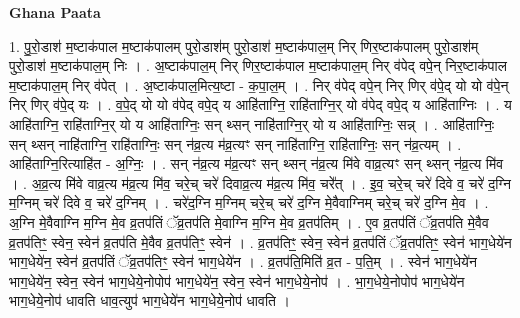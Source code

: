 \documentclass[17pt]{extarticle}
\begin{document}
\textbf{Ghana Paata } \newline

1. पु॒रो॒डाश॑ म॒ष्टाक॑पाल म॒ष्टाक॑पालम् पुरो॒डाश॑म् पुरो॒डाश॑ म॒ष्टाक॑पाल॒म् निर् णिर॒ष्टाक॑पालम् पुरो॒डाश॑म् पुरो॒डाश॑ म॒ष्टाक॑पाल॒म् निः । . अ॒ष्टाक॑पाल॒म् निर् णिर॒ष्टाक॑पाल म॒ष्टाक॑पाल॒म् निर् व॑पेद् वपे॒न् निर॒ष्टाक॑पाल म॒ष्टाक॑पाल॒म् निर् व॑पेत् । . अ॒ष्टाक॑पाल॒मित्य॒ष्टा - क॒पा॒ल॒म् । . निर् व॑पेद् वपे॒न् निर् णिर् व॑पे॒द् यो यो व॑पे॒न् निर् णिर् व॑पे॒द् यः । . व॒पे॒द् यो यो व॑पेद् वपे॒द् य आहि॑ताग्नि॒ राहि॑ताग्नि॒र् यो व॑पेद् वपे॒द् य आहि॑ताग्निः । . य आहि॑ताग्नि॒ राहि॑ताग्नि॒र् यो य आहि॑ताग्निः॒ सन् थ्सन् नाहि॑ताग्नि॒र् यो य आहि॑ताग्निः॒ सन्न् । . आहि॑ताग्निः॒ सन् थ्सन् नाहि॑ताग्नि॒ राहि॑ताग्निः॒ सन् न॑व्र॒त्य म॑व्र॒त्यꣳ सन् नाहि॑ताग्नि॒ राहि॑ताग्निः॒ सन् न॑व्र॒त्यम् । . आहि॑ताग्नि॒रित्याहि॑त - अ॒ग्निः॒ । . सन् न॑व्र॒त्य म॑व्र॒त्यꣳ सन् थ्सन् न॑व्र॒त्य मि॑वे वाव्र॒त्यꣳ सन् थ्सन् न॑व्र॒त्य मि॑व । . अ॒व्र॒त्य मि॑वे वाव्र॒त्य म॑व्र॒त्य मि॑व॒ चरे॒च् चरे॑ दिवाव्र॒त्य म॑व्र॒त्य मि॑व॒ चरे᳚त् । . इ॒व॒ चरे॒च् चरे॑ दिवे व॒ चरे॑ द॒ग्नि म॒ग्निम् चरे॑ दिवे व॒ चरे॑ द॒ग्निम् । . चरे॑द॒ग्नि म॒ग्निम् चरे॒च् चरे॑ द॒ग्नि मे॒वैवाग्निम् चरे॒च् चरे॑ द॒ग्नि मे॒व । . अ॒ग्नि मे॒वैवाग्नि म॒ग्नि मे॒व व्र॒तप॑तिं ॅव्र॒तप॑ति मे॒वाग्नि म॒ग्नि मे॒व व्र॒तप॑तिम् । . ए॒व व्र॒तप॑तिं ॅव्र॒तप॑ति मे॒वैव व्र॒तप॑तिꣳ॒॒ स्वेन॒ स्वेन॑ व्र॒तप॑ति मे॒वैव व्र॒तप॑तिꣳ॒॒ स्वेन॑ । . व्र॒तप॑तिꣳ॒॒ स्वेन॒ स्वेन॑ व्र॒तप॑तिं ॅव्र॒तप॑तिꣳ॒॒ स्वेन॑ भाग॒धेये॑न भाग॒धेये॑न॒ स्वेन॑ व्र॒तप॑तिं ॅव्र॒तप॑तिꣳ॒॒ स्वेन॑ भाग॒धेये॑न । . व्र॒तप॑ति॒मिति॑ व्र॒त - प॒ति॒म् । . स्वेन॑ भाग॒धेये॑न भाग॒धेये॑न॒ स्वेन॒ स्वेन॑ भाग॒धेये॒नोपोप॑ भाग॒धेये॑न॒ स्वेन॒ स्वेन॑ भाग॒धेये॒नोप॑ । . भा॒ग॒धेये॒नोपोप॑ भाग॒धेये॑न भाग॒धेये॒नोप॑ धावति धाव॒त्युप॑ भाग॒धेये॑न भाग॒धेये॒नोप॑ धावति । \newline
\end{document}
